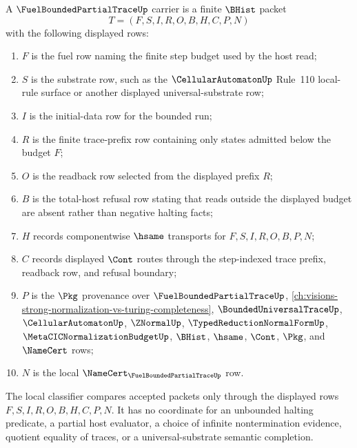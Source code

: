 \begin{definition}
\label{def:fuel-bounded-partial-trace-carrier}
A $\FuelBoundedPartialTraceUp$ carrier is a finite $\BHist$ packet
$$
T=(F,S,I,R,O,B,H,C,P,N)
$$
with the following displayed rows:
\begin{enumerate}
\item $F$ is the fuel row naming the finite step budget used by the host read;
\item $S$ is the substrate row, such as the $\CellularAutomatonUp$ Rule~110 local-rule surface or another displayed universal-substrate row;
\item $I$ is the initial-data row for the bounded run;
\item $R$ is the finite trace-prefix row containing only states admitted below the budget $F$;
\item $O$ is the readback row selected from the displayed prefix $R$;
\item $B$ is the total-host refusal row stating that reads outside the displayed budget are absent rather than negative halting facts;
\item $H$ records componentwise $\hsame$ transports for $F,S,I,R,O,B,P,N$;
\item $C$ records displayed $\Cont$ routes through the step-indexed trace prefix, readback row, and refusal boundary;
\item $P$ is the $\Pkg$ provenance over $\FuelBoundedPartialTraceUp$, \autoref{ch:visions-strong-normalization-vs-turing-completeness}, $\BoundedUniversalTraceUp$, $\CellularAutomatonUp$, $\ZNormalUp$, $\TypedReductionNormalFormUp$, $\MetaCICNormalizationBudgetUp$, $\BHist$, $\hsame$, $\Cont$, $\Pkg$, and $\NameCert$ rows;
\item $N$ is the local $\NameCert_{\FuelBoundedPartialTraceUp}$ row.
\end{enumerate}
The local classifier compares accepted packets only through the displayed rows $F,S,I,R,O,B,H,C,P,N$. It has no coordinate for an unbounded halting predicate, a partial host evaluator, a choice of infinite nontermination evidence, quotient equality of traces, or a universal-substrate semantic completion.
\end{definition}

